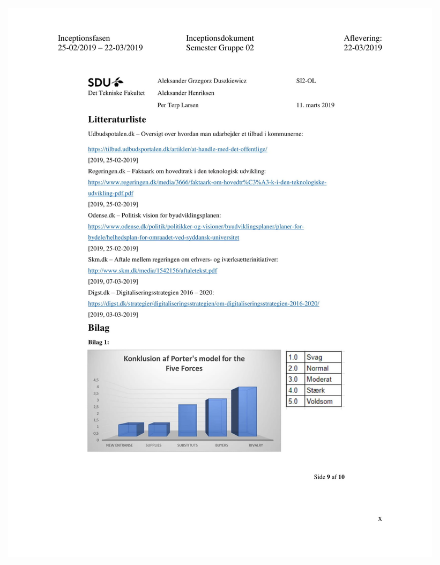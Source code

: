 \begin{figure}[hb]
  \includegraphics[scale = 0.33]{./PNG/Inceptions/Gruppe02+InceptionsDokument-43.jpg} 
\end{figure}

